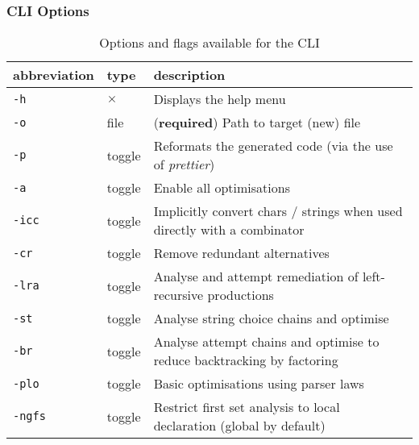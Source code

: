 \subsubsection*{CLI Options}
\vspace{-0.5\baselineskip}

\begin{table}[H]
    \centering
    \begin{tabularx}{\linewidth}{ll||X}
        \textbf{abbreviation} & \textbf{type} & \textbf{description} \\
        \hline
        \texttt{-h} & $\times$ & Displays the help menu \\
        \texttt{-o} & file & (\textbf{required}) Path to target (new) file \\
        \texttt{-p} & toggle & Reformats the generated code (via the use of \textit{prettier}) \\
        \texttt{-a} & toggle & Enable all optimisations \\
        \texttt{-icc} & toggle & Implicitly convert chars / strings when used directly with a combinator \\
        \texttt{-cr} & toggle & Remove redundant alternatives \\
        \texttt{-lra} & toggle & Analyse and attempt remediation of left-recursive productions \\
        \texttt{-st} & toggle & Analyse string choice chains and optimise \\
        \texttt{-br} & toggle & Analyse attempt chains and optimise to reduce backtracking by factoring \\
        \texttt{-plo} & toggle & Basic optimisations using parser laws \\
        \texttt{-ngfs} & toggle & Restrict first set analysis to local declaration (global by default)
    \end{tabularx}
    \caption{Options and flags available for the CLI}
    \label{tab:cli_opt}
\end{table}

